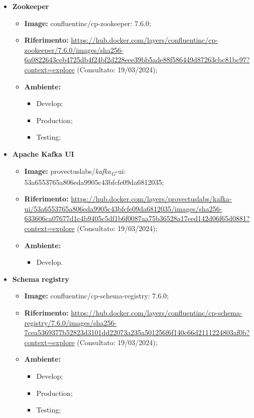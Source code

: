 \begin{itemize}
  \item \textbf{Zookeeper} 
    \begin{itemize}
      \item \textbf{Image:} confluentinc/cp-zookeeper: 7.6.0;
      \item \textbf{Riferimento:} \url{https://hub.docker.com/layers/confluentinc/cp-zookeeper/7.6.0/images/sha256-6a0822643ceb4725db4f24bf2d228eee39bb5ade88f586449d87263cbc81bc97?context=explore} (Consultato: 19/03/2024);
      \item \textbf{Ambiente:}
        \begin{itemize}
          \item Develop;
          \item Production;
          \item Testing;
        \end{itemize}
    \end{itemize}

  \item \textbf{Apache Kafka UI} 
    \begin{itemize}
      \item \textbf{Image:} provectuslabs/\textit{kafka}\textsubscript{\textit{G}}-ui: 53a6553765a806eda9905c43bfcfe09da6812035;
      \item \textbf{Riferimento:} \url{https://hub.docker.com/layers/provectuslabs/kafka-ui/53a6553765a806eda9905c43bfcfe09da6812035/images/sha256-633606ca07677d1c4b9405c5df1b6f0087aa75b36528a17eed142d06f65d0881?context=explore} (Consultato: 19/03/2024);
      \item \textbf{Ambiente:}
        \begin{itemize}
          \item Develop.
        \end{itemize}
    \end{itemize}

  \item \textbf{Schema registry} 
    \begin{itemize}
      \item \textbf{Image:} confluentinc/cp-schema-registry: 7.6.0;
      \item \textbf{Riferimento:} \url{https://hub.docker.com/layers/confluentinc/cp-schema-registry/7.6.0/images/sha256-7cea5369377b52823d3101dd22073a235a501256f6f140c66d2111224803af0b?context=explore} (Consultato: 19/03/2024);
      \item \textbf{Ambiente:}
        \begin{itemize}
          \item Develop;
          \item Production;
          \item Testing;
        \end{itemize}
    \end{itemize}


\end{itemize}
